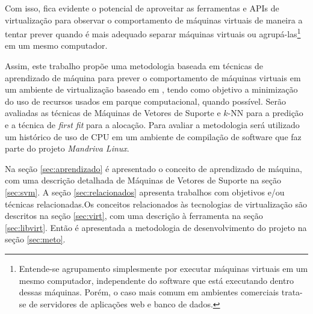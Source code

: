 Com isso, fica evidente o potencial de aproveitar as ferramentas e APIs de
virtualização para observar o comportamento de máquinas virtuais de maneira
a tentar prever quando é mais adequado separar máquinas virtuais ou
agrupá-las\footnote{Entende-se agrupamento simplesmente por
executar máquinas virtuais em um mesmo computador, independente do software
que está executando dentro dessas máquinas. Porém, o caso mais comum em
ambientes comerciais trata-se de servidores de aplicações web e banco de
dados.} em um mesmo computador. 

Assim, este trabalho propõe uma metodologia baseada em técnicas de
aprendizado de máquina para prever o comportamento de máquinas
virtuais em um ambiente de virtualização baseado em \libvirt{}, tendo como
objetivo a minimização do uso de recursos usados em parque computacional,
quando possível. Serão avaliadas as técnicas de Máquinas de Vetores de
Suporte e $k$-NN para a predição e a técnica de \emph{first fit} para a
alocação. Para avaliar a metodologia será utilizado um histórico de uso de
CPU em um ambiente de compilação de software que faz parte do projeto
\emph{Mandriva Linux}.

Na seção \ref{sec:aprendizado} é apresentado o conceito de aprendizado de
máquina, com uma descrição detalhada de Máquinas de Vetores de Suporte na
seção \ref{sec:svm}. A seção \ref{sec:relacionados} apresenta trabalhos com
objetivos e/ou técnicas relacionadas.Os conceitos relacionados às tecnologias
de virtualização são descritos na seção \ref{sec:virt}, com uma descrição à
ferramenta \libvirt{} na seção \ref{sec:libvirt}. Então é apresentada a
metodologia de desenvolvimento do projeto na seção \ref{sec:meto}.
